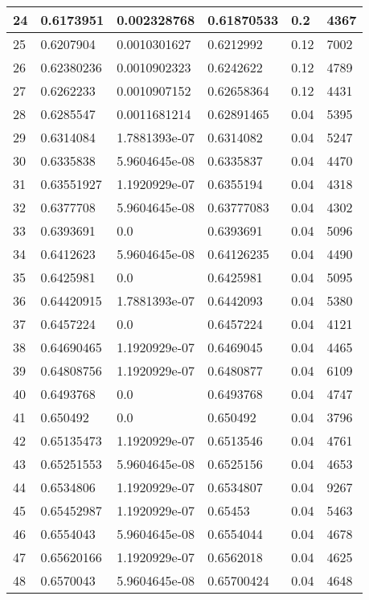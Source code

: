 \begin{longtable}{|l|l|l|l|l|l|}
24 & 0.6173951 & 0.002328768 & 0.61870533 & 0.2 & 4367 \\ \hline 
25 & 0.6207904 & 0.0010301627 & 0.6212992 & 0.12 & 7002 \\ \hline 
26 & 0.62380236 & 0.0010902323 & 0.6242622 & 0.12 & 4789 \\ \hline 
27 & 0.6262233 & 0.0010907152 & 0.62658364 & 0.12 & 4431 \\ \hline 
28 & 0.6285547 & 0.0011681214 & 0.62891465 & 0.04 & 5395 \\ \hline 
29 & 0.6314084 & 1.7881393e-07 & 0.6314082 & 0.04 & 5247 \\ \hline 
30 & 0.6335838 & 5.9604645e-08 & 0.6335837 & 0.04 & 4470 \\ \hline 
31 & 0.63551927 & 1.1920929e-07 & 0.6355194 & 0.04 & 4318 \\ \hline 
32 & 0.6377708 & 5.9604645e-08 & 0.63777083 & 0.04 & 4302 \\ \hline 
33 & 0.6393691 & 0.0 & 0.6393691 & 0.04 & 5096 \\ \hline 
34 & 0.6412623 & 5.9604645e-08 & 0.64126235 & 0.04 & 4490 \\ \hline 
35 & 0.6425981 & 0.0 & 0.6425981 & 0.04 & 5095 \\ \hline 
36 & 0.64420915 & 1.7881393e-07 & 0.6442093 & 0.04 & 5380 \\ \hline 
37 & 0.6457224 & 0.0 & 0.6457224 & 0.04 & 4121 \\ \hline 
38 & 0.64690465 & 1.1920929e-07 & 0.6469045 & 0.04 & 4465 \\ \hline 
39 & 0.64808756 & 1.1920929e-07 & 0.6480877 & 0.04 & 6109 \\ \hline 
40 & 0.6493768 & 0.0 & 0.6493768 & 0.04 & 4747 \\ \hline 
41 & 0.650492 & 0.0 & 0.650492 & 0.04 & 3796 \\ \hline 
42 & 0.65135473 & 1.1920929e-07 & 0.6513546 & 0.04 & 4761 \\ \hline 
43 & 0.65251553 & 5.9604645e-08 & 0.6525156 & 0.04 & 4653 \\ \hline 
44 & 0.6534806 & 1.1920929e-07 & 0.6534807 & 0.04 & 9267 \\ \hline 
45 & 0.65452987 & 1.1920929e-07 & 0.65453 & 0.04 & 5463 \\ \hline 
46 & 0.6554043 & 5.9604645e-08 & 0.6554044 & 0.04 & 4678 \\ \hline 
47 & 0.65620166 & 1.1920929e-07 & 0.6562018 & 0.04 & 4625 \\ \hline 
48 & 0.6570043 & 5.9604645e-08 & 0.65700424 & 0.04 & 4648 \\ \hline 

\end{longtable}
